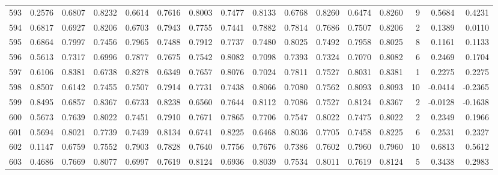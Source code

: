 \begin{tabular}{lrrrrrrrrrrrrrrr}
593 &      0.2576 &  0.6807 &  0.8232 &  0.6614 &  0.7616 &  0.8003 &  0.7477 &  0.8133 &  0.6768 &  0.8260 &   0.6474 &     0.8260 &      9 &                    0.5684 &                     0.4231 \\
594 &      0.6817 &  0.6927 &  0.8206 &  0.6703 &  0.7943 &  0.7755 &  0.7441 &  0.7882 &  0.7814 &  0.7686 &   0.7507 &     0.8206 &      2 &                    0.1389 &                     0.0110 \\
595 &      0.6864 &  0.7997 &  0.7456 &  0.7965 &  0.7488 &  0.7912 &  0.7737 &  0.7480 &  0.8025 &  0.7492 &   0.7958 &     0.8025 &      8 &                    0.1161 &                     0.1133 \\
596 &      0.5613 &  0.7317 &  0.6996 &  0.7877 &  0.7675 &  0.7542 &  0.8082 &  0.7098 &  0.7393 &  0.7324 &   0.7070 &     0.8082 &      6 &                    0.2469 &                     0.1704 \\
597 &      0.6106 &  0.8381 &  0.6738 &  0.8278 &  0.6349 &  0.7657 &  0.8076 &  0.7024 &  0.7811 &  0.7527 &   0.8031 &     0.8381 &      1 &                    0.2275 &                     0.2275 \\
598 &      0.8507 &  0.6142 &  0.7455 &  0.7507 &  0.7914 &  0.7731 &  0.7438 &  0.8066 &  0.7080 &  0.7562 &   0.8093 &     0.8093 &     10 &                   -0.0414 &                    -0.2365 \\
599 &      0.8495 &  0.6857 &  0.8367 &  0.6733 &  0.8238 &  0.6560 &  0.7644 &  0.8112 &  0.7086 &  0.7527 &   0.8124 &     0.8367 &      2 &                   -0.0128 &                    -0.1638 \\
600 &      0.5673 &  0.7639 &  0.8022 &  0.7451 &  0.7910 &  0.7671 &  0.7865 &  0.7706 &  0.7547 &  0.8022 &   0.7475 &     0.8022 &      2 &                    0.2349 &                     0.1966 \\
601 &      0.5694 &  0.8021 &  0.7739 &  0.7439 &  0.8134 &  0.6741 &  0.8225 &  0.6468 &  0.8036 &  0.7705 &   0.7458 &     0.8225 &      6 &                    0.2531 &                     0.2327 \\
602 &      0.1147 &  0.6759 &  0.7552 &  0.7903 &  0.7828 &  0.7640 &  0.7756 &  0.7676 &  0.7386 &  0.7602 &   0.7960 &     0.7960 &     10 &                    0.6813 &                     0.5612 \\
603 &      0.4686 &  0.7669 &  0.8077 &  0.6997 &  0.7619 &  0.8124 &  0.6936 &  0.8039 &  0.7534 &  0.8011 &   0.7619 &     0.8124 &      5 &                    0.3438 &                     0.2983 \\

\end{tabular}
